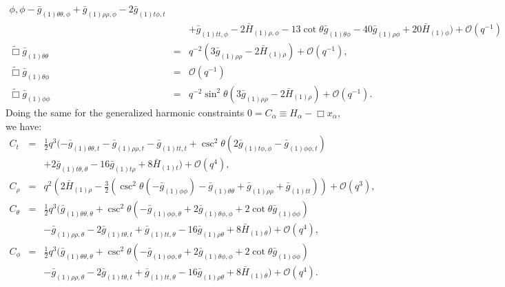 \documentclass[a4paper,11pt]{article}
\numberwithin{equation}{section}
\begin{document}
\begin{eqnarray}
{   \phi ,\phi }-\bar{g}_{(1)\theta \theta,\phi }+\bar{g}_{(1) \rho \rho ,\phi }-2
   \bar{g}_{(1) \text{$t$$\phi $},t}\nonumber\\
   &&+\bar{g}_{(1) \text{$tt$},\phi }-2 \bar{H}_{(1) \rho ,\phi }-13
   \cot \theta  \bar{g}_{(1)\theta \phi}-40 \bar{g}_{(1) \rho \phi }+20 \bar{H}_{(1) \phi
   })+\mathcal{O}(q^{-1})\\
%
\label{eqn:efethetatheta_3p1}
\tilde{\Box}\bar{g}_{(1)\theta\theta}&=&q^{-2}  \left(3 \bar{g}_{(1) \rho \rho }-2 \bar{H}_{(1) \rho }\right)+\mathcal{O}(q^{-1}),\\
%
\label{eqn:efethetaphi_3p1}
\tilde{\Box}\bar{g}_{(1)\theta\phi}&=&\mathcal{O}(q^{-1})\\
%
\label{eqn:efephiphi_3p1}
\tilde{\Box}\bar{g}_{(1)\phi\phi}&=&q^{-2}  \sin^2\theta\left(3 \bar{g}_{(1) \rho \rho }-2 \bar{H}_{(1) \rho }\right)+\mathcal{O}(q^{-1}).
\end{eqnarray}
Doing the same for the generalized harmonic constraints $0=C_\alpha\equiv H_\alpha-\Box x_\alpha$, we have:
\begin{eqnarray}
\label{eqn:ct_3p1}
C_t&=&\frac{1}{2} q^3 (-\bar{g}_{(1)\theta \theta,t}-\bar{g}_{(1) \rho \rho ,t}-\bar{g}_{(1)
   \text{$tt$},t}+\csc ^2\theta \left(2 \bar{g}_{(1) \text{$t$$\phi $},\phi }-\bar{g}_{(1)
   \phi \phi ,t}\right)\nonumber\\
   &&+2 \bar{g}_{(1) \text{$t$$\theta $},\theta }-16 \bar{g}_{(1)
   \text{$t$$\rho $}}+8 \bar{H}_{(1) t})+\mathcal{O}(q^4),\\
%
\label{eqn:crho_3p1}
C_\rho&=&q^2 \left(2 \bar{H}_{(1) \rho }-\frac{3}{2} \left(\csc^2\theta \left(-\bar{g}_{(1) \phi
   \phi }\right)-\bar{g}_{(1)\theta \theta}+\bar{g}_{(1) \rho \rho }+\bar{g}_{(1)
   \text{$tt$}}\right)\right)+\mathcal{O}(q^3),\\
%
\label{eqn:ctheta_3p1}
C_\theta&=&\frac{1}{2} q^3 (\bar{g}_{(1)\theta \theta,\theta }+\csc ^2\theta
   \left(-\bar{g}_{(1) \phi \phi ,\theta }+2 \bar{g}_{(1)\theta \phi,\phi }+2 \cot \theta
    \bar{g}_{(1) \phi \phi }\right)\nonumber\\
   &&-\bar{g}_{(1) \rho \rho ,\theta }-2 \bar{g}_{(1)
   \text{$t$$\theta $},t}+\bar{g}_{(1) \text{$tt$},\theta }-16 \bar{g}_{(1) \rho \theta }+8
   \bar{H}_{(1)\theta})+\mathcal{O}(q^4),\\
%
\label{eqn:cphi_3p1}
C_\phi&=&\frac{1}{2} q^3 (\bar{g}_{(1)\theta \theta,\theta }+\csc ^2\theta
   \left(-\bar{g}_{(1) \phi \phi ,\theta }+2 \bar{g}_{(1)\theta \phi,\phi }+2 \cot \theta
    \bar{g}_{(1) \phi \phi }\right)\nonumber\\
   &&-\bar{g}_{(1) \rho \rho ,\theta }-2 \bar{g}_{(1)
   \text{$t$$\theta $},t}+\bar{g}_{(1) \text{$tt$},\theta }-16 \bar{g}_{(1) \rho \theta }+8
   \bar{H}_{(1)\theta})+\mathcal{O}(q^4).
\end{eqnarray}
\end{document}
